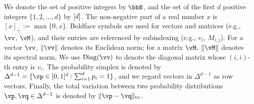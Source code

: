 We denote the set of positive integers by $\bbN$, and
the set of the first $d$ positive integers $\{1,2,\dotsc,d\}$ by $[d]$.
The non-negative part of a real number $x$ is $[x]_+ := \max\{0,x\}$.
Boldface symbols are used for vectors and matrices (e.g., $\vv$,
$\vM$), and their entries are referenced by subindexing (e.g., $v_i$,
$M_{i,j}$).
For a vector $\vv$, $\norm{\vv}$ denotes its Euclidean norm; for a
matrix $\vM$, $\norm{\vM}$ denotes its spectral norm.
We use $\Diag(\vv)$ to denote the diagonal matrix whose $(i,i)$-th
entry is $v_i$.
The probability simplex is denoted by $\Delta^{d-1} = \{ \vp
\in [0,1]^d : \sum_{i=1}^d p_i = 1 \}$, and we regard vectors in
$\Delta^{d-1}$ as row vectors.
Finally, the total variation between two probability distributions
$\vp, \vq \in \Delta^{d-1}$ is denoted by $\norm{\vp-\vq}_{\tv}$.
